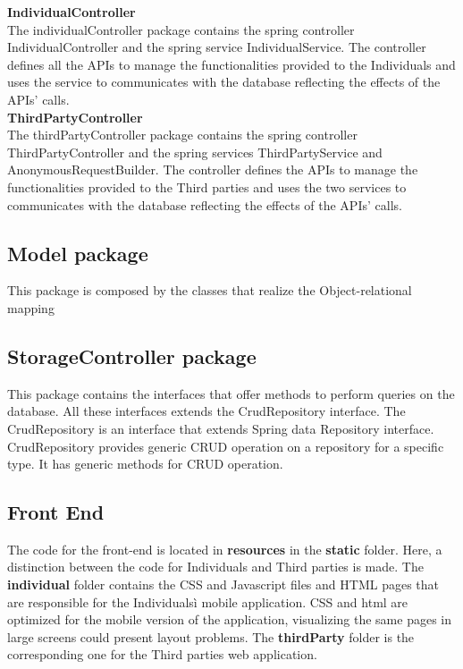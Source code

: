 \textbf{IndividualController}\\
The individualController package contains the spring controller IndividualController and the spring service IndividualService.
The controller defines all the APIs to manage the functionalities provided to the Individuals and uses the service to communicates with the database reflecting the effects of the APIs' calls.\\

\textbf{ThirdPartyController}\\
The thirdPartyController package contains the spring controller ThirdPartyController and the spring services ThirdPartyService and AnonymousRequestBuilder.
The controller defines the APIs to manage the functionalities provided to the Third parties and uses the two services to communicates with the database reflecting the effects of the APIs' calls.

\subsection*{\textbf{Model package}}
This package is composed by the classes that realize the Object-relational mapping

\subsection*{\textbf{StorageController package}}
This package contains the interfaces that offer methods to perform queries on the database. All these interfaces extends the CrudRepository interface. The CrudRepository is an interface that extends Spring data Repository interface. CrudRepository provides generic CRUD operation on a repository for a specific type. It has generic methods for CRUD operation. 

\subsection{Front End} 
The code for the front-end is located in \textbf{resources} in the \textbf{static} folder. Here, a distinction between the code for Individuals and Third parties is made. The \textbf{individual} folder contains the CSS and Javascript files and HTML pages that are responsible for the Individualsì mobile application. CSS and html are optimized for the mobile version of the application, visualizing the same pages in large screens could present layout problems.
The \textbf{thirdParty} folder is the corresponding one for the Third parties web application.
